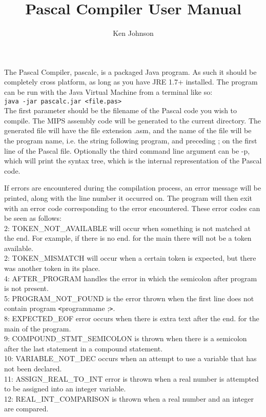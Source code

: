 \documentclass[12pt]{scrreprt}
\author{Ken Johnson}
\title{Pascal Compiler User Manual}
\begin{document}
\maketitle

The Pascal Compiler, pascalc, is a packaged Java program. As such it should be
completely cross platform, as long as you have JRE 1.7+ installed. The program
can be run with the Java Virtual Machine from a terminal like so:\\
\texttt{java -jar pascalc.jar <file.pas> }\\
The first parameter should be the filename of the Pascal code you wish to compile.
The MIPS assembly code will be generated to the current directory. The generated
file will have the file extension .asm, and the name of the file will be the
program name, i.e. the string following program, and preceding ; on the first
line of the Pascal file. Optionally the third command line argument can be
-p, which will print the syntax tree, which is the internal representation of
the Pascal code.\par\noindent

If errors are encountered during the compilation process, an error message
will be printed, along with the line number it occurred on. The program
will then exit with an error code corresponding to the error encountered.
These error codes can be seen as follows: \\

2: TOKEN\_NOT\_AVAILABLE will occur when something is not matched at the end. For
example, if there is no end. for the main there will not be a token available.\\

2: TOKEN\_MISMATCH will occur when a certain token is expected, but there was another
token in its place.\\



4: AFTER\_PROGRAM handles the error in which the semicolon after program is not 
present. \\


5: PROGRAM\_NOT\_FOUND is the error thrown when the first line does not
contain program \verb|<|programname ;\verb|>|. \\


8: EXPECTED\_EOF error occurs when there is extra text after the end. for the
main of the program. \\


9: COMPOUND\_STMT\_SEMICOLON is thrown when there is a semicolon after the
last statement in a compound statement. \\


10: VARIABLE\_NOT\_DEC occurs when an attempt to use a variable that has not
been declared. \\

11: ASSIGN\_REAL\_TO\_INT error is thrown when a real number is attempted to
be assigned into an integer variable. \\


12: REAL\_INT\_COMPARISON is thrown when a real number and an integer are compared. \\
\end{document}
